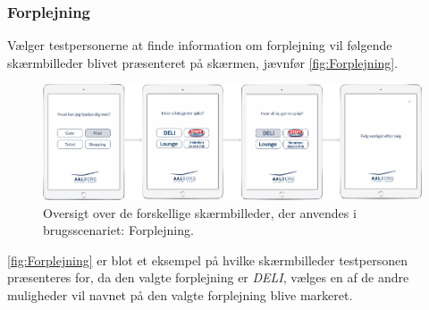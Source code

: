 \subsubsection*{Forplejning}
%
Vælger testpersonerne at finde information om forplejning vil følgende skærmbilleder blivet præsenteret på skærmen, jævnfør \autoref{fig:Forplejning}. 
%
\begin{figure}[H]
\centering
\includegraphics[width = \textwidth]{Figure/Forplejning} 
\caption{Oversigt over de forskellige skærmbilleder, der anvendes i brugsscenariet: Forplejning.}
\label{fig:Forplejning}
\end{figure}
\noindent
% 
\autoref{fig:Forplejning} er blot et eksempel på hvilke skærmbilleder testpersonen præsenteres for, da den valgte forplejning er \textit{DELI}, vælges en af de andre muligheder vil navnet på den valgte forplejning blive markeret. 

